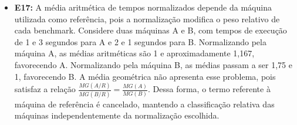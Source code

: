 \documentclass[12pt,a4paper,titlepage]{article}
\begin{document}
\begin{itemize}
    \item\textbf{E17:}
        A média aritmética de tempos normalizados depende da máquina utilizada como referência, pois a normalização modifica
        o peso relativo de cada benchmark. Considere duas máquinas A e B, com tempos de execução de 1 e 3 segundos para A
        e 2 e 1 segundos para B.
        Normalizando pela máquina A, as médias aritméticas são 1 e aproximadamente 1,167, favorecendo A.
        Normalizando pela máquina B, as médias passam a ser 1,75 e 1, favorecendo B.
        A média geométrica não apresenta esse problema, pois satisfaz a relação
        $\frac{MG(A/R)}{MG(B/R)} = \frac{MG(A)}{MG(B)}$.
        Dessa forma, o termo referente à máquina de referência é cancelado, mantendo a classificação relativa das máquinas
        independentemente da normalização escolhida.
\end{itemize}
\end{document}
